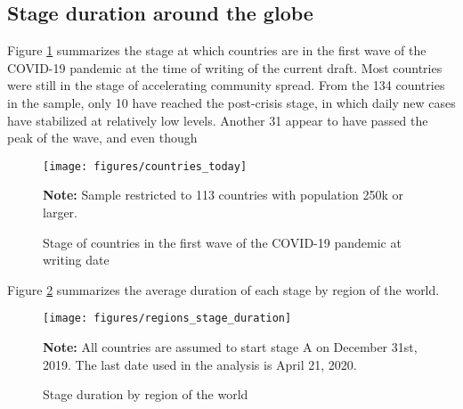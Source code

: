 \documentclass[12pt,english]{article}
\begin{document}
\subsection{Stage duration around the globe}

Figure \ref{fig:current_stage} summarizes the stage at which countries are in the first wave of the COVID-19 pandemic at the time of writing of the current draft. Most countries were still in the stage of accelerating community spread.  From the 134 countries in the sample, only 10 have reached the post-crisis stage, in which daily new cases have stabilized at relatively low levels. Another 31 appear to have passed the peak of the wave, and even though


\begin{figure}[H]
	\singlespacing
	\centering
	 \caption{Stage of countries in the first wave of the COVID-19 pandemic at writing date}  \label{fig:current_stage}
	\resizebox{0.8\width}{!} {
		\begin{threeparttable}

 			  \texttt{[image: figures/countries\_today]}
  			 \begin{tablenotes}[flushleft]\vspace*{-7bp}
			\item \textbf{Note:} Sample restricted to 113 countries with population 250k or larger.
			 \end{tablenotes}
  		\end{threeparttable}
 		}
  	 \onehalfspacing
\end{figure}

Figure \ref{fig:stage_by_region} summarizes the average duration of each stage by region of the world.

\begin{figure}[H]
	\singlespacing
	\centering
	 \caption{Stage duration by region of the world}  \label{fig:stage_by_region}
	\resizebox{0.7\width}{!} {
		\begin{threeparttable}

 			  \texttt{[image: figures/regions\_stage\_duration]}
  			 \begin{tablenotes}[flushleft]\vspace*{-7bp}
			\item \textbf{Note:} All countries are assumed to start stage A on December 31st, 2019.  The last date used in the analysis is April 21, 2020.
			 \end{tablenotes}
  		\end{threeparttable}
 		}
  	 \onehalfspacing
\end{figure}
\end{document}
